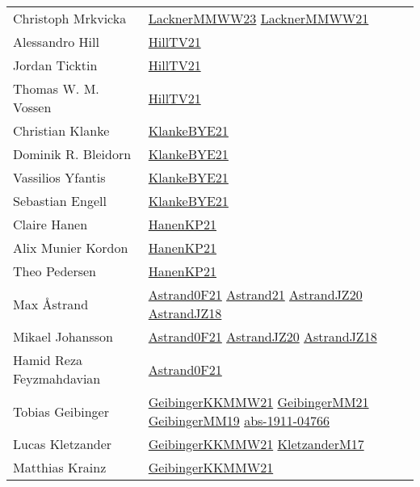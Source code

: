 {\begin{longtable}{p{4cm}p{15cm}}
Christoph Mrkvicka & \href{articles/LacknerMMWW23.pdf}{LacknerMMWW23}\cite{LacknerMMWW23} \href{papers/LacknerMMWW21.pdf}{LacknerMMWW21}\cite{LacknerMMWW21} \\
Alessandro Hill & \href{papers/HillTV21.pdf}{HillTV21}\cite{HillTV21} \\
Jordan Ticktin & \href{papers/HillTV21.pdf}{HillTV21}\cite{HillTV21} \\
Thomas W. M. Vossen & \href{papers/HillTV21.pdf}{HillTV21}\cite{HillTV21} \\
Christian Klanke & \href{papers/KlankeBYE21.pdf}{KlankeBYE21}\cite{KlankeBYE21} \\
Dominik R. Bleidorn & \href{papers/KlankeBYE21.pdf}{KlankeBYE21}\cite{KlankeBYE21} \\
Vassilios Yfantis & \href{papers/KlankeBYE21.pdf}{KlankeBYE21}\cite{KlankeBYE21} \\
Sebastian Engell & \href{papers/KlankeBYE21.pdf}{KlankeBYE21}\cite{KlankeBYE21} \\
Claire Hanen & \href{papers/HanenKP21.pdf}{HanenKP21}\cite{HanenKP21} \\
Alix Munier Kordon & \href{papers/HanenKP21.pdf}{HanenKP21}\cite{HanenKP21} \\
Theo Pedersen & \href{papers/HanenKP21.pdf}{HanenKP21}\cite{HanenKP21} \\
Max {\AA}strand & \href{papers/Astrand0F21.pdf}{Astrand0F21}\cite{Astrand0F21} \href{}{Astrand21}\cite{Astrand21} \href{articles/AstrandJZ20.pdf}{AstrandJZ20}\cite{AstrandJZ20} \href{papers/AstrandJZ18.pdf}{AstrandJZ18}\cite{AstrandJZ18} \\
Mikael Johansson & \href{papers/Astrand0F21.pdf}{Astrand0F21}\cite{Astrand0F21} \href{articles/AstrandJZ20.pdf}{AstrandJZ20}\cite{AstrandJZ20} \href{papers/AstrandJZ18.pdf}{AstrandJZ18}\cite{AstrandJZ18} \\
Hamid Reza Feyzmahdavian & \href{papers/Astrand0F21.pdf}{Astrand0F21}\cite{Astrand0F21} \\
Tobias Geibinger & \href{papers/GeibingerKKMMW21.pdf}{GeibingerKKMMW21}\cite{GeibingerKKMMW21} \href{papers/GeibingerMM21.pdf}{GeibingerMM21}\cite{GeibingerMM21} \href{papers/GeibingerMM19.pdf}{GeibingerMM19}\cite{GeibingerMM19} \href{articles/abs-1911-04766.pdf}{abs-1911-04766}\cite{abs-1911-04766} \\
Lucas Kletzander & \href{papers/GeibingerKKMMW21.pdf}{GeibingerKKMMW21}\cite{GeibingerKKMMW21} \href{papers/KletzanderM17.pdf}{KletzanderM17}\cite{KletzanderM17} \\
Matthias Krainz & \href{papers/GeibingerKKMMW21.pdf}{GeibingerKKMMW21}\cite{GeibingerKKMMW21} \\

\end{longtable}}
